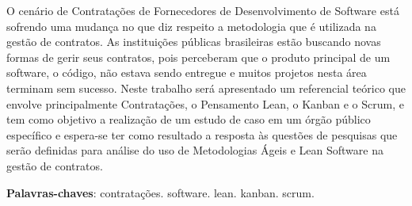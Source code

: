 \begin{resumo}
 O cenário de Contratações de Fornecedores de Desenvolvimento de Software
está sofrendo uma mudança no que diz respeito a metodologia que é utilizada na gestão de contratos.
As instituições públicas brasileiras estão buscando novas formas de gerir seus contratos, pois
perceberam que o produto principal de um software, o código, não estava sendo entregue
e muitos projetos nesta área terminam sem sucesso. Neste trabalho será apresentado um referencial 
teórico que envolve principalmente Contratações, o Pensamento Lean, o Kanban e o Scrum, e tem como objetivo a realização de um estudo de caso em um órgão público específico e espera-se ter como resultado a resposta às questões de pesquisas
que serão definidas para análise do uso de Metodologias Ágeis e Lean Software na gestão de contratos.

 \vspace{\onelineskip}
    
 \noindent
 \textbf{Palavras-chaves}: contratações. software. lean. kanban. scrum.
\end{resumo}
